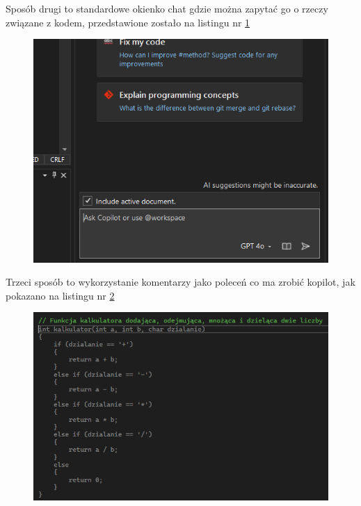 Sposób drugi to standardowe okienko chat gdzie można zapytać go o rzeczy związane z kodem, przedstawione zostało na listingu nr \ref{fig:copilotchat}

\begin{figure}[H]
	\centering
	\includegraphics[width=1\linewidth]{images/CopilotChat}
	\caption{}
	\label{fig:copilotchat}
\end{figure}

Trzeci sposób to wykorzystanie komentarzy jako poleceń co ma zrobić kopilot, jak pokazano na listingu nr \ref{fig:copilotcomments}

\begin{figure}[H]
	\centering
	\includegraphics[width=1\linewidth]{images/CopilotComments}
	\caption{}
	\label{fig:copilotcomments}
\end{figure}



